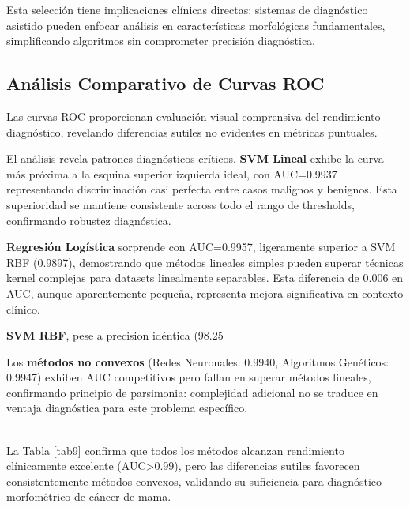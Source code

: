 \documentclass[conference]{IEEEtran}
\begin{document}
Esta selección tiene implicaciones clínicas directas: sistemas de diagnóstico asistido pueden enfocar análisis en características morfológicas fundamentales, simplificando algoritmos sin comprometer precisión diagnóstica.

\subsection{Análisis Comparativo de Curvas ROC}

Las curvas ROC proporcionan evaluación visual comprensiva del rendimiento diagnóstico, revelando diferencias sutiles no evidentes en métricas puntuales.

El análisis revela patrones diagnósticos críticos. \textbf{SVM Lineal} exhibe la curva más próxima a la esquina superior izquierda ideal, con AUC=0.9937 representando discriminación casi perfecta entre casos malignos y benignos. Esta superioridad se mantiene consistente across todo el rango de thresholds, confirmando robustez diagnóstica.

\textbf{Regresión Logística} sorprende con AUC=0.9957, ligeramente superior a SVM RBF (0.9897), demostrando que métodos lineales simples pueden superar técnicas kernel complejas para datasets linealmente separables. Esta diferencia de 0.006 en AUC, aunque aparentemente pequeña, representa mejora significativa en contexto clínico.

\textbf{SVM RBF}, pese a precision idéntica (98.25%

Los \textbf{métodos no convexos} (Redes Neuronales: 0.9940, Algoritmos Genéticos: 0.9947) exhiben AUC competitivos pero fallan en superar métodos lineales, confirmando principio de parsimonia: complejidad adicional no se traduce en ventaja diagnóstica para este problema específico.

\\
La Tabla \ref{tab9} confirma que todos los métodos alcanzan rendimiento clínicamente excelente (AUC>0.99), pero las diferencias sutiles favorecen consistentemente métodos convexos, validando su suficiencia para diagnóstico morfométrico de cáncer de mama.
\end{document}
